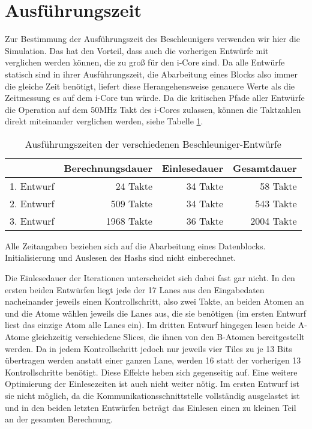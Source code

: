 \section{Ausführungszeit}
Zur Bestimmung der Ausführungszeit des Beschleunigers verwenden wir hier die Simulation. Das hat den Vorteil,
dass auch die vorherigen Entwürfe mit verglichen werden können, die zu groß für den i-Core sind.
Da alle Entwürfe statisch sind in ihrer Ausführungszeit, die Abarbeitung eines Blocks also immer die gleiche Zeit benötigt,
liefert diese Herangehensweise genauere Werte als die Zeitmessung es auf dem i-Core tun würde.
Da die kritischen Pfade aller Entwürfe die Operation auf dem 50MHz Takt des i-Cores zulassen, können die Taktzahlen direkt miteinander verglichen werden, siehe Tabelle \ref{tab:zeiten_alle_iterationen}.
\begin{table}
    \centering
    \begin{tabular}{lrrr}
        & Berechnungsdauer & Einlesedauer & Gesamtdauer\\
        \hline
        1. Entwurf & 24 Takte & 34 Takte & 58 Takte \\
        2. Entwurf & 509 Takte & 34 Takte & 543 Takte \\
        3. Entwurf & 1968 Takte & 36 Takte & 2004 Takte
    \end{tabular}
    \label{tab:zeiten_alle_iterationen}
    \caption{Ausführungszeiten der verschiedenen Beschleuniger-Entwürfe}
    \small Alle Zeitangaben beziehen sich auf die Abarbeitung eines Datenblocks. Initialisierung und Auslesen des Hashs sind nicht einberechnet.
\end{table}
Die Einlesedauer der Iterationen unterscheidet sich dabei fast gar nicht. In den ersten beiden Entwürfen liegt jede der 17 Lanes aus den Eingabedaten
nacheinander jeweils einen Kontrollschritt, also zwei Takte, an beiden Atomen an und die Atome wählen jeweils die Lanes aus, die sie benötigen
(im ersten Entwurf liest das einzige Atom alle Lanes ein).
Im dritten Entwurf hingegen lesen beide A-Atome gleichzeitig verschiedene Slices, die ihnen von den B-Atomen bereitgestellt werden.
Da in jedem Kontrollschritt jedoch nur jeweils vier Tiles zu je 13 Bits übertragen werden anstatt einer ganzen Lane, werden 16 statt der vorherigen 13 Kontrollschritte benötigt.
Diese Effekte heben sich gegenseitig auf. Eine weitere Optimierung der Einlesezeiten ist auch nicht weiter nötig. Im ersten Entwurf ist sie nicht möglich,
da die Kommunikationsschnittstelle vollständig ausgelastet ist und in den beiden letzten Entwürfen beträgt das Einlesen einen zu kleinen Teil an der gesamten Berechnung.

